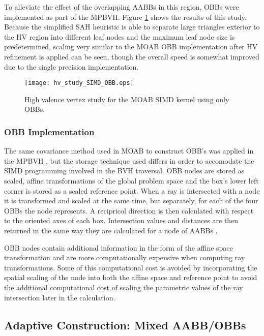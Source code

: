 To alleviate the effect of the overlapping AABBs in this region, OBBs were
implemented as part of the MPBVH. Figure \ref{fig:hv_study_simd_obbs} shows the
results of this study. Because the simplified SAH heuristic is able to separate
large triangles exterior to the HV region into different leaf nodes and the
maximum leaf node size is predetermined, scaling very similar to the MOAB OBB
implementation after HV refinement is applied can be seen, though the overall
speed is somewhat improved due to the single precision implementation.

\begin{figure}
  \centering
  \texttt{[image: hv\_study\_SIMD\_OBB.eps]}
  \caption{High valence vertex study for the MOAB SIMD kernel using only OBBs.}
  \label{fig:hv_study_simd_obbs}
\end{figure}

\subsubsection{OBB Implementation}

The same covariance method used in MOAB to construct OBB's was applied in the
MPBVH \cite{Weghorst_1984}, but the storage technique used differs in order to
accomodate the SIMD programming involved in the BVH traversal. OBB nodes are
stored as scaled, affine transformations of the global problem space and the
box's lower left corner is stored as a scaled reference point. When a ray is
intersected with a node it is transformed and scaled at the same time, but
separately, for each of the four OBBs the node represents. A recipricol
direction is then calculated with respect to the oriented axes of each
box. Intersection values and distances are then returned in the same way they
are calculated for a node of AABBs \cite{Wald_2014}.

OBB nodes contain additional information in the form of the affine space
transformation and are more computationally expensive when computing ray
transformations. Some of this computational cost is avoided by incorporating the
spatial scaling of the node into both the affine space and reference point to
avoid the additional computational cost of scaling the parametric values of the
ray intersection later in the calculation.

\subsection{Adaptive Construction: Mixed AABB/OBBs}

